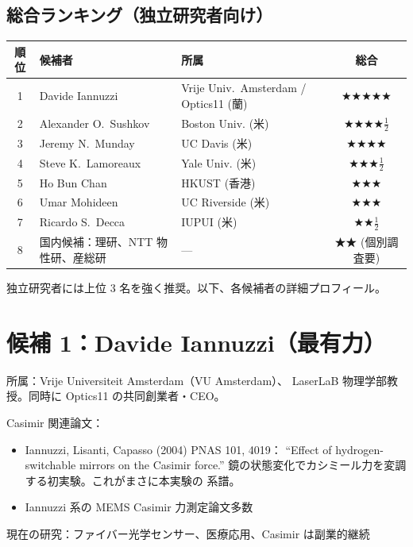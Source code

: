 \documentclass[11pt,a4paper]{article}
\def\textbf#1{#1}%
\begin{document}
\subsection{総合ランキング（独立研究者向け）}

\begin{center}
\renewcommand{\arraystretch}{1.4}
\begin{tabular}{cllc}
\toprule
順位 & 候補者 & 所属 & 総合 \\
\midrule
\textbf{1} & Davide Iannuzzi      & Vrije Univ.\ Amsterdam / Optics11 (蘭) & ★★★★★ \\
2 & Alexander O.\ Sushkov & Boston Univ. (米)         & ★★★★$\frac{1}{2}$ \\
3 & Jeremy N.\ Munday    & UC Davis (米)              & ★★★★ \\
4 & Steve K.\ Lamoreaux  & Yale Univ. (米)            & ★★★$\frac{1}{2}$ \\
5 & Ho Bun Chan          & HKUST (香港)               & ★★★ \\
6 & Umar Mohideen        & UC Riverside (米)          & ★★★ \\
7 & Ricardo S.\ Decca    & IUPUI (米)                 & ★★$\frac{1}{2}$ \\
\midrule
8 & 国内候補：理研、NTT 物性研、産総研 & --- & ★★ (個別調査要) \\
\bottomrule
\end{tabular}
\end{center}

\textbf{独立研究者には上位 3 名を強く推奨}。以下、各候補者の詳細プロフィール。

\newpage

\section{候補 1：Davide Iannuzzi（最有力）}

\begin{candidatebox}
\textbf{所属}：Vrije Universiteit Amsterdam（VU Amsterdam）、
LaserLaB 物理学部教授。同時に \textbf{Optics11} の共同創業者・CEO。

\textbf{Casimir 関連論文}：
\begin{itemize}
\item \textbf{Iannuzzi, Lisanti, Capasso (2004) PNAS 101, 4019}：
  ``Effect of hydrogen-switchable mirrors on the Casimir force.''
  \textbf{鏡の状態変化でカシミール力を変調する初実験}。これがまさに本実験の
  系譜。
\item Iannuzzi 系の MEMS Casimir 力測定論文多数
\end{itemize}

\textbf{現在の研究}：ファイバー光学センサー、医療応用、Casimir は副業的継続
\end{candidatebox}
\end{document}
